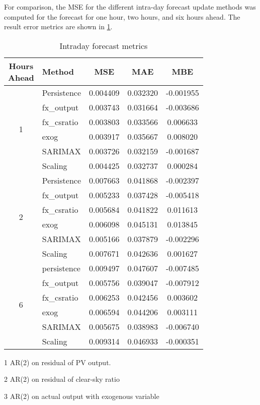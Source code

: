 For comparison, the MSE for the different intra-day forecast update methods was computed for the forecast for one hour, two hours, and six hours ahead. The result error metrics are shown in \cref{table:intraday-metrics}.

\begin{table}
	\centering
\begin{threeparttable}
	\caption{Intraday forecast metrics}
	\label{table:intraday-metrics}
	\begin{tabular}{clccc}
		\toprule
		\shortstack{Hours\\Ahead} & Method & MSE & MAE & MBE \\
		\midrule
		\multirow[c]{6}{*}{1} & Persistence & 0.004409 & 0.032320 & -0.001955 \\
		& fx\_output\tnote{1} & 0.003743 & 0.031664 & -0.003686 \\
		& fx\_csratio\tnote{2} & 0.003803 & 0.033566 & 0.006633 \\
		& exog\tnote{3} & 0.003917 & 0.035667 & 0.008020 \\
		& SARIMAX & 0.003726 & 0.032159 & -0.001687 \\
		& Scaling & 0.004425 & 0.032737 & 0.000284 \\
		\midrule
		\multirow[c]{6}{*}{2} & Persistence & 0.007663 & 0.041868 & -0.002397 \\
		& fx\_output\tnote{1} & 0.005233 & 0.037428 & -0.005418 \\
		& fx\_csratio\tnote{2} & 0.005684 & 0.041822 & 0.011613 \\
		& exog\tnote{3} & 0.006098 & 0.045131 & 0.013845 \\
		& SARIMAX & 0.005166 & 0.037879 & -0.002296 \\
		& Scaling & 0.007671 & 0.042636 & 0.001627 \\
		\midrule
		\multirow[c]{6}{*}{6} & persistence & 0.009497 & 0.047607 & -0.007485 \\
		& fx\_output\tnote{1} & 0.005756 & 0.039047 & -0.007912 \\
		& fx\_csratio\tnote{2} & 0.006253 & 0.042456 & 0.003602 \\
		& exog\tnote{3} & 0.006594 & 0.044206 & 0.003111 \\
		& SARIMAX & 0.005675 & 0.038983 & -0.006740 \\
		& Scaling & 0.009314 & 0.046933 & -0.000351 \\
		\bottomrule
	\end{tabular}
	\begin{tablenotes}
		\footnotesize
		\item[1] AR(2) on residual of PV output.
		\item[2] AR(2) on residual of clear-sky ratio
		\item[3] AR(2) on actual output with exogenous variable
	\end{tablenotes}
\end{threeparttable}
\end{table}



